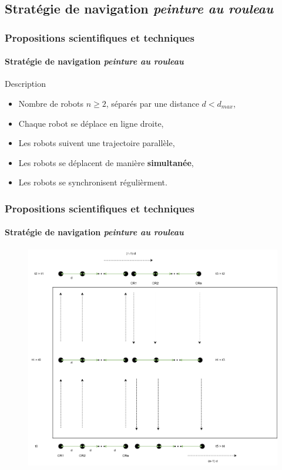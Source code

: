 \documentclass{beamer}
\begin{document}
		\subsection{Stratégie de navigation \textit{peinture au rouleau}}
			\begin{frame}
				\frametitle{Propositions scientifiques et techniques}
				\framesubtitle{Stratégie de navigation \textit{peinture au rouleau}}
				\begin{block}{Description}
					\begin{itemize}
						\item Nombre de robots $n \ge 2$, séparés par une distance $d < d_{max}$,
						\item Chaque robot se déplace en ligne droite,
						\item Les robots suivent une trajectoire parallèle,
						\item Les robots se déplacent de manière \textbf{simultanée},
						\item Les robots se synchronisent régulièrment.
					\end{itemize}
				\end{block}
			\end{frame}
			\begin{frame}
				\frametitle{Propositions scientifiques et techniques}
				\framesubtitle{Stratégie de navigation \textit{peinture au rouleau}}
				\begin{figure}
					\centering
					\includegraphics[width=0.7\linewidth]{graphics/peinture_au_rouleau.png}
				\end{figure}
			\end{frame}
\end{document}
